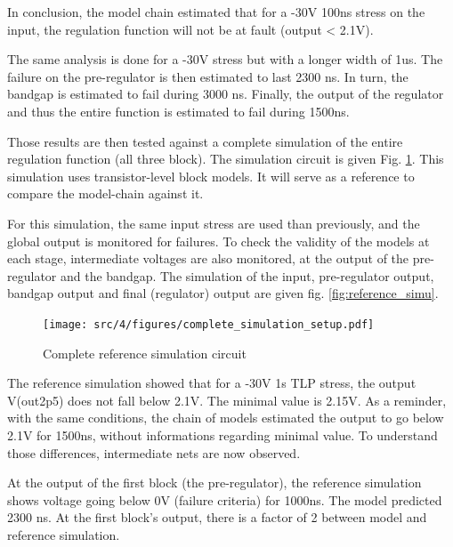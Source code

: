 In conclusion, the model chain estimated that for a -30V 100ns stress on the input, the regulation function will not be at fault (output < 2.1V).

The same analysis is done for a -30V stress but with a longer width of 1us.
The failure on the pre-regulator is then estimated to last 2300 ns.
In turn, the bandgap is estimated to fail during 3000 ns.
Finally, the output of the regulator and thus the entire function is estimated to fail during 1500ns.

Those results are then tested against a complete simulation of the entire regulation function (all three block).
The simulation circuit is given Fig. \ref{fig:reference_simu_circuit}.
This simulation uses transistor-level block models.
It will serve as a reference to compare the model-chain against it.

For this simulation, the same input stress are used than previously, and the global output is monitored for failures.
To check the validity of the models at each stage, intermediate voltages are also monitored, at the output of the pre-regulator and the bandgap.
The simulation of the input, pre-regulator output, bandgap output and final (regulator) output are given fig. \ref{fig:reference_simu}.

\begin{figure}[!htbp]
  \centering
  \texttt{[image: src/4/figures/complete\_simulation\_setup.pdf]}
  \caption{Complete reference simulation circuit}
  \label{fig:reference_simu_circuit}
\end{figure}

The reference simulation showed that for a -30V 1\textmugreek{}s TLP stress, the output V(out2p5) does not fall below 2.1V.
The minimal value is 2.15V.
As a reminder, with the same conditions, the chain of models estimated the output to go below 2.1V for 1500ns, without informations regarding minimal value.
To understand those differences, intermediate nets are now observed.

At the output of the first block (the pre-regulator), the reference simulation shows voltage going below 0V (failure criteria) for 1000ns.
The model predicted 2300 ns.
At the first block's output, there is a factor of 2 between model and reference simulation.

